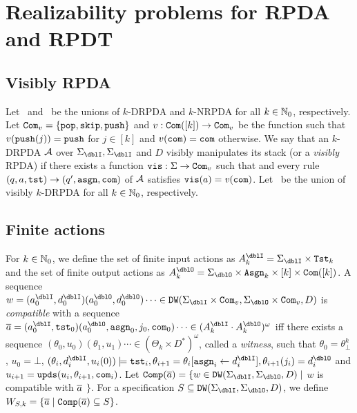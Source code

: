 \section{Realizability problems for RPDA and RPDT}
\subsection{Visibly RPDA}
Let \DRPDA\ and \NRPDA\ be the unions of $k$-DRPDA and $k$-NRPDA for all $k\in\mathbb{N}_0$, respectively.
Let $\mathtt{Com}_v=\{\mathtt{pop},\mathtt{skip},\mathtt{push}\}$ and $v:\mathtt{Com}([k])\to\mathtt{Com}_v$ be the function such that $v(\mathtt{push}(j))=\mathtt{push}$ for $j\in[k]$ and $v(\mathtt{com})=\mathtt{com}$ otherwise.
We say that an $k$-DRPDA ${\cal A}$
over $\Sigma_\dblI,\Sigma_\dblI$ and $D$
visibly manipulates its stack (or a {\em visibly} RPDA) if
there exists a function $\mathtt{vis}: \Sigma\to\mathtt{Com}_v$
such that
and every rule $(q,a,\mathtt{tst})\to(q',\mathtt{asgn},\mathtt{com})$ of ${\cal A}$
satisfies $\mathtt{vis}(a)=\mathit{v}(\mathtt{com})$.
Let \DRPDAv\ be the union of visibly $k$-DRPDA for all $k\in\mathbb{N}_0$, respectively.



\subsection{Finite actions}
For $k\in\mathbb{N}_0$,
we define the set of finite input actions as $A_k^\dblI = \Sigma_\dblI\times \Tst_k$
and the set of finite output actions as $A_k^\dblO = \Sigma_\dblO\times \Asgn_k\times [k]\times \Com([k])$.
A sequence $w = (a^\dblI_0,d^\dblI_0) (a^\dblO_0,d^\dblO_0)\cdots \in \DW(\Sigma_\dblI\times\Com_v,\Sigma_\dblO\times\Com_v,D)$ is \emph{compatible} with a sequence
$\overa = (a^\dblI_0, \tst_0)(a^\dblO_0,\asgn_0,j_0, \com_0)\cdots \in (A_k^\dblI\cdot A_k^\dblO)^\omega$
iff there exists a sequence $(\theta_0,u_0)(\theta_1, u_1)\cdots\in (\Theta_k\times D^*)^\omega$, called a \emph{witness}, such that
$\theta_0 = \theta^{k}_\bot$, $u_0 = \bot$,
$(\theta_i, d^\dblI_i, u_i(0)) \models \tst_i, \theta_{i+1}=\theta_i[\asgn_i\leftarrow d^\dblI_i], \theta_{i+1}(j_i) = d^\dblO_i$ and $u_{i+1}=\mathtt{upds}(u_i,\theta_{i+1},\mathtt{com}_i)$.
Let $\Comp(\overa) = \{w\in \DW(\Sigma_\dblI,\Sigma_\dblO,D)\mid$ $w$ is compatible with ${\overline{a}}$ $\}$.
For a specification $S \subseteq \DW(\Sigma_\dblI,\Sigma_\dblO,D)$, we define $W_{S,k}=\{{\overline{a}}\mid {\mathtt{Comp}}({\overline{a}})\subseteq S\}$.

